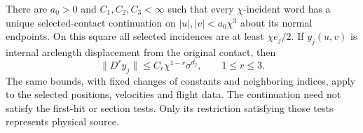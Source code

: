 \begin{theorem}
\label{thm:v66-contact-jets}
There are $a_0>0$ and $C_1,C_2,C_3<\infty$ such that every
$\chi$-incident word has a unique selected-contact continuation on
$|u|,|v|<a_0\chi^3$ about its normal endpoints. On this square all
selected incidences are at least $\chi e_j/2$. If $y_j(u,v)$ is
internal arclength displacement from the original contact, then
\begin{equation}\label{eq:v66-contact-jets}
 \|D^r y_j\|\le C_r\chi^{1-r}\sigma^{d_j},
              \qquad 1\le r\le3.
\end{equation}
The same bounds, with fixed changes of constants and neighboring
indices, apply to the selected positions, velocities and flight data.
The continuation need not satisfy the first-hit or section tests.
Only its restriction satisfying those tests represents physical source.
\end{theorem}
